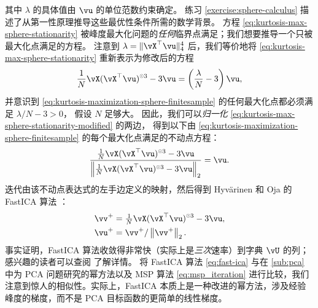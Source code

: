 \documentclass[../../book-main.tex]{subfiles}
\begin{document}
其中 $\lambda$ 的具体值由 $\vu$ 的单位范数约束确定。
练习 \ref{exercise:sphere-calculus} 描述了从第一性原理推导这些最优性条件所需的数学背景。
方程 \eqref{eq:kurtosis-max-sphere-stationarity} 被峰度最大化问题的\textit{任何}临界点满足；我们想要推导一个只被最大化点满足的方程。
注意到 $\lambda = \norm{\vX^\top \vu}_4^4$ 后，我们等价地将 \eqref{eq:kurtosis-max-sphere-stationarity} 重新表示为修改后的方程
\begin{align}\label{eq:kurtosis-max-sphere-stationarity-modified}
   \frac{1}{N}\vX (\vX^\top \vu)^{\hada 3} 
   - 
   3 \vu
   = 
   \left(
   \frac{\lambda}{N} - 3
   \right)
   \vu,
\end{align}
并意识到 \eqref{eq:kurtosis-maximization-sphere-finitesample} 的任何最大化点都必须满足 $\lambda / N - 3 > 0$，
假设 $N$ 足够大。
因此，我们可以\textit{归一化} \eqref{eq:kurtosis-max-sphere-stationarity-modified} 的两边，
得到以下由 \eqref{eq:kurtosis-maximization-sphere-finitesample} 的每个最大化点满足的不动点方程：
\begin{align}\label{eq:kurtosis-max-sphere-fxp}
\frac{
   \frac{1}{N}\vX (\vX^\top \vu)^{\hada 3} 
   - 
   3 \vu
   }{
   \norm*{
   \frac{1}{N}\vX (\vX^\top \vu)^{\hada 3} 
   - 
   3 \vu
   }_2
   }
   =
   \vu.
\end{align}
迭代由该不动点表达式的左手边定义的映射，然后得到 Hyvärinen 和 Oja 的 FastICA 算法 \cite{hyvarinen-1997}：
\begin{equation}
\begin{split}\label{eq:fast-ica}
   \vv^+ &= \tfrac{1}{N}\vX (\vX^\top \vu)^{\hada 3}- 3 \vu
   ,  \\
   \vu^+ &= \vv^+ / \norm*{\vv^+}_2.
   \end{split}
\end{equation}
事实证明，FastICA 算法收敛得非常快（实际上是\textit{三次}速率）到字典 $\vU$ 的列；感兴趣的读者可以查阅 \cite{hyvarinen-1997} 了解详情。
将 FastICA 算法 \eqref{eq:fast-ica} 与在 \ref{sub:pca} 中为 PCA 问题研究的幂方法以及 MSP 算法 \eqref{eq:msp_iteration} 进行比较，我们注意到惊人的相似性。实际上，FastICA 本质上是一种改进的幂方法，涉及经验峰度的梯度，而不是 PCA 目标函数的更简单的线性梯度。

\end{document}
